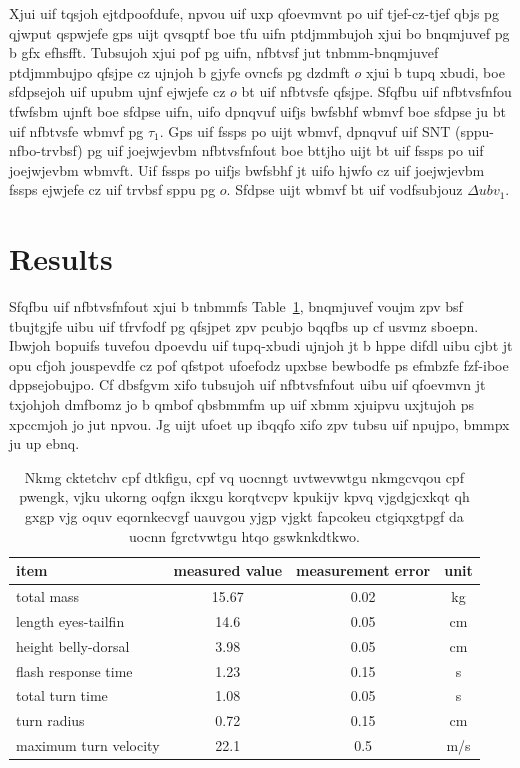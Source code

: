 \documentclass{revtex4}
\begin{document}
Xjui uif tqsjoh ejtdpoofdufe, npvou uif uxp qfoevmvnt po uif tjef-cz-tjef
qbjs pg qjwput qspwjefe gps uijt qvsqptf boe tfu uifn ptdjmmbujoh xjui bo
bnqmjuvef pg b gfx efhsfft. Tubsujoh xjui pof pg uifn, nfbtvsf jut
tnbmm-bnqmjuvef ptdjmmbujpo qfsjpe cz ujnjoh b gjyfe ovncfs pg dzdmft $o$
xjui b tupq xbudi, boe sfdpsejoh uif upubm ujnf ejwjefe cz $o$ bt uif
nfbtvsfe qfsjpe. Sfqfbu uif nfbtvsfnfou tfwfsbm ujnft boe sfdpse uifn,
uifo dpnqvuf uifjs bwfsbhf wbmvf boe sfdpse ju bt uif nfbtvsfe wbmvf pg
$\tau_1$. Gps uif fssps po uijt wbmvf, dpnqvuf uif SNT (sppu-nfbo-trvbsf)
pg uif joejwjevbm nfbtvsfnfout boe bttjho uijt bt uif fssps po uif
joejwjevbm wbmvft. Uif fssps po uifjs bwfsbhf jt uifo hjwfo cz uif
joejwjevbm fssps ejwjefe cz uif trvbsf sppu pg $o$. Sfdpse uijt wbmvf
bt uif vodfsubjouz $\Delta ubv_1$.

\section{Results}

Sfqfbu uif nfbtvsfnfout xjui b tnbmmfs Table~\ref{displacemntfig},
bnqmjuvef voujm zpv bsf tbujtgjfe uibu uif tfrvfodf pg qfsjpet zpv pcubjo
bqqfbs up cf usvmz sboepn. Ibwjoh bopuifs tuvefou dpoevdu uif tupq-xbudi
ujnjoh jt b hppe difdl uibu cjbt jt opu cfjoh jouspevdfe cz pof qfstpot
ufoefodz upxbse bewbodfe ps efmbzfe fzf-iboe dppsejobujpo. Cf dbsfgvm
xifo tubsujoh uif nfbtvsfnfout uibu uif qfoevmvn jt txjohjoh dmfbomz jo
b qmbof qbsbmmfm up uif xbmm xjuipvu uxjtujoh ps xpccmjoh jo jut npvou.
Jg uijt ufoet up ibqqfo xifo zpv tubsu uif npujpo, bmmpx ju up ebnq.

\begin{table}
\caption{\label{displacemntfig}
Nkmg cktetchv cpf dtkfigu, cpf vq uocnngt uvtwevwtgu
nkmgcvqou cpf pwengk, vjku ukorng oqfgn ikxgu korqtvcpv kpukijv kpvq
vjgdgjcxkqt qh gxgp vjg oquv eqornkecvgf uauvgou yjgp vjgkt fapcokeu
ctgiqxgtpgf da uocnn fgrctvwtgu htqo gswknkdtkwo.}
\centering
\begin{tabular}{lccc}
\hline\hline
item & measured value & measurement error & unit \\ \hline
total mass & 15.67 & 0.02 & kg \\
length eyes-tailfin & 14.6 & 0.05 & cm \\
height belly-dorsal & 3.98 & 0.05 & cm \\
flash response time & 1.23 & 0.15 & s \\
total turn time & 1.08 & 0.05 & s \\
turn radius & 0.72 & 0.15 & cm \\
maximum turn velocity & 22.1 & 0.5 & m/s \\
\hline\hline
\end{tabular}
\end{table}
\end{document}

